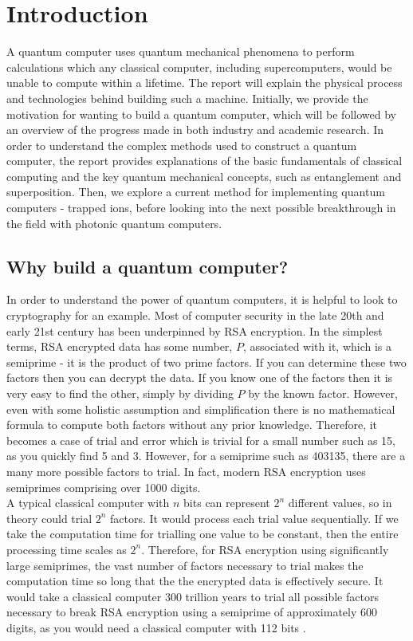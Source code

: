 \section{Introduction}
A quantum computer uses quantum mechanical phenomena to perform calculations which any classical computer, including supercomputers, would be unable to compute within a lifetime. \cite{noauthor_what_nodate}
The report will explain the physical process and technologies behind building such a machine. Initially, we provide the motivation for wanting to build a quantum computer, which will be followed by an overview of the progress made in both industry and academic research. In order to understand the complex methods used to construct a quantum computer, the report provides explanations of the basic fundamentals of classical computing and the key quantum mechanical concepts, such as entanglement and superposition. Then, we explore a current method for implementing quantum computers - trapped ions, before looking into the next possible breakthrough in the field with photonic quantum computers.

\subsection{Why build a quantum computer?}
In order to understand the power of quantum computers, it is helpful to look to cryptography for an example. Most of computer security in the late 20th and early 21st century has been underpinned by RSA encryption. In the simplest terms, RSA encrypted data has some number, $P$, associated with it, which is a semiprime - it is the product of two prime factors. If you can determine these two factors then you can decrypt the data. If you know one of the factors then it is very easy to find the other, simply by dividing $P$ by the known factor. However, even with some holistic assumption and simplification there is no mathematical formula to compute both factors without any prior knowledge. Therefore, it becomes a case of trial and error which is trivial for a small number such as 15, as you quickly find 5 and 3. However, for a semiprime such as 403135, there are a many more possible factors to trial. In fact, modern RSA encryption uses semiprimes comprising over 1000 digits.\\

A typical classical computer with $n$ bits can represent $2^n$ different values, so in theory could trial $2^n$ factors. It would process each trial value sequentially. If we take the computation time for trialling one value to be constant, then the entire processing time scales as $2^n$. Therefore, for RSA encryption using significantly large semiprimes, the vast number of factors necessary to trial makes the computation time so long that the the encrypted data is effectively secure. It would take a classical computer 300 trillion years to trial all possible factors necessary to break RSA encryption using a semiprime of approximately 600 digits, as you would need a classical computer with 112 bits \cite{mahto2016security}\cite{quintessencelabs_2022}.\\

